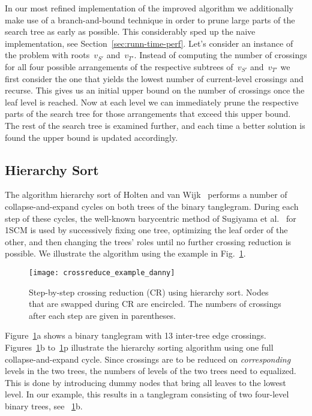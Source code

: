 \documentclass[runningheads,a4paper]{llncs}
\begin{document}
In our most refined implementation of the improved algorithm we
additionally make use of a branch-and-bound technique in order to
prune large parts of the search tree as early as possible.  This
considerably sped up the naive implementation, see
Section~\ref{sec:runn-time-perf}. Let's consider an instance of the
problem with roots~$v_{S'}$ and~$v_{T'}$. Instead of computing the
number of crossings for all four possible arrangements of the
respective subtrees of~$v_{S'}$ and~$v_{T'}$ we first consider the one
that yields the lowest number of current-level crossings and
recurse. This gives us an initial upper bound on the number of
crossings once the leaf level is reached. Now at each level we can
immediately prune the respective parts of the search tree for those
arrangements that exceed this upper bound. The rest of the search tree
is examined further, and each time a better solution is found the
upper bound is updated accordingly.

\subsection{Hierarchy Sort}\label{sec:hier-sort-algo}

The algorithm hierarchy sort of Holten and van Wijk~\cite{hw-vchod-08}
performs a number of collapse-and-expand cycles on both trees of the
binary tanglegram.  During each step of these cycles, the well-known
barycentric method of Sugiyama et al.~\cite{stt-mvuhs-81} for 1SCM is
used by successively fixing one tree, optimizing
the leaf order of the other, and then changing the trees' roles until no
further crossing reduction is possible. 
We illustrate the algorithm using the example in
Fig.~\ref{fig:hierarchysorting}. 

\begin{figure}[tb]
  {\texttt{[image: crossreduce\_example\_danny]}}
  \caption{Step-by-step crossing reduction (CR) using hierarchy sort. Nodes that are swapped during CR
    are encircled. The numbers of crossings after each step are given in parentheses.}
  \label{fig:hierarchysorting}
\end{figure}

Figure~\ref{fig:hierarchysorting}a shows a binary tanglegram with 13
inter-tree edge crossings.  Figures~\ref{fig:hierarchysorting}b
to~\ref{fig:hierarchysorting}p illustrate the hierarchy sorting
algorithm using one full collapse-and-expand cycle. Since crossings
are to be reduced on \emph{corresponding} levels in the two trees,
the numbers of levels of the two trees need to equalized.  This is
done by introducing dummy nodes that bring all leaves to the lowest
level.  In our example, this results in a
tanglegram consisting of two four-level binary trees, see
\figurename~\ref{fig:hierarchysorting}b.
\end{document}
